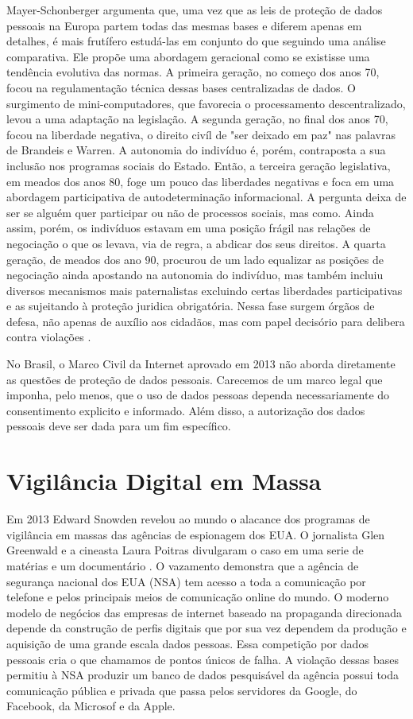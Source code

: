 Mayer-Schonberger argumenta que, uma vez que as leis de proteção de dados pessoais na Europa partem todas das mesmas bases e diferem apenas em detalhes, é mais frutífero estudá-las em conjunto do que seguindo uma análise comparativa.
Ele propõe uma abordagem geracional como se existisse uma tendência evolutiva das normas.
A primeira geração, no começo dos anos 70, focou na regulamentação técnica dessas bases centralizadas de dados.
O surgimento de mini-computadores, que favorecia o processamento descentralizado, levou a uma adaptação na legislação.
A segunda geração, no final dos anos 70, focou na liberdade negativa, o direito civíl de "ser deixado em paz" nas palavras de Brandeis e Warren.
A autonomia do indivíduo é, porém, contraposta a sua inclusão nos programas sociais do Estado.
Então, a terceira geração legislativa, em meados dos anos 80, foge um pouco das liberdades negativas e foca em uma abordagem participativa de autodeterminação informacional.
A pergunta deixa de ser se alguém quer participar ou não de processos sociais, mas como.
Ainda assim, porém, os indivíduos estavam em uma posição frágil nas relações de negociação o que os levava, via de regra, a abdicar dos seus direitos.
A quarta geração, de meados dos ano 90, procurou de um lado equalizar as posições de negociação ainda apostando na autonomia do indivíduo, mas também incluiu diversos mecanismos mais paternalistas excluindo certas liberdades participativas e as sujeitando à proteção juridica obrigatória.
Nessa fase surgem órgãos de defesa, não apenas de auxílio aos cidadãos, mas com papel decisório para delibera contra violações \cite{}.

No Brasil, o Marco Civil da Internet aprovado em 2013 não aborda diretamente as questões de proteção de dados pessoais.
Carecemos de um marco legal que imponha, pelo menos, que o uso de dados pessoas dependa necessariamente do consentimento explicito e informado.
Além disso, a autorização dos dados pessoais deve ser dada para um fim específico.

\section{Vigilância Digital em Massa}
\label{sec:vigil-digital}

Em 2013 Edward Snowden revelou ao mundo o alacance dos programas de vigilância em massas das agências de espionagem dos EUA.
O jornalista Glen Greenwald e a cineasta Laura Poitras divulgaram o caso em uma serie de matérias e um documentário \cite{}.
O vazamento demonstra que a agência de segurança nacional dos EUA (NSA) tem acesso a toda a comunicação por telefone e pelos principais meios de comunicação online do mundo.
O moderno modelo de negócios das empresas de internet baseado na propaganda direcionada depende da construção de perfis digitais que por sua vez dependem da produção e aquisição de uma grande escala dados pessoas.
Essa competição por dados pessoais cria o que chamamos de pontos únicos de falha.
A violação dessas bases permitiu à NSA produzir um banco de dados pesquisável da agência possui toda comunicação pública e privada que passa pelos servidores da Google, do Facebook, da Microsof e da Apple.

